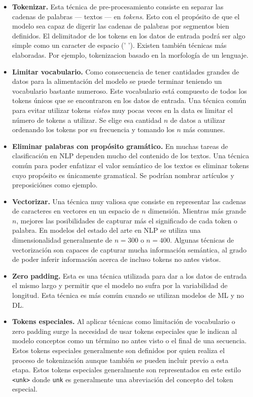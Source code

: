\begin{itemize}
\item \textbf{Tokenizar.} Esta técnica de pre-procesamiento consiste en separar las cadenas de palabras --- textos --- en \emph{tokens}. Esto con el propósito de que el modelo sea capaz de digerir las cadenas de palabras por segmentos bien definidos. El delimitador de los tokens en los datos de entrada podrá ser algo simple como un caracter de espacio (' '). Existen también técnicas más elaboradas. Por ejemplo, \gls{tokenizacion} basado en la morfología de un lenguaje.
\item \textbf{Limitar \gls{vocabulario}.} Como consecuencia de tener cantidades grandes de datos para la alimentación del modelo se puede terminar teniendo un vocabulario bastante numeroso. Este vocabulario está compuesto de todos los tokens únicos que se encontraron en los datos de entrada. Una técnica común para evitar utilizar tokens \emph{vistos} muy pocas veces en la data es limitar el número de tokens a utilizar. Se elige esa cantidad $n$ de datos a utilizar ordenando los tokens por su frecuencia y tomando los $n$ más comunes.
\item \textbf{Eliminar palabras con propósito gramático.} En muchas tareas de clasificación en NLP dependen mucho del contenido de los textos. Una técnica común para poder enfatizar el valor semántico de los textos es eliminar tokens cuyo propósito es únicamente gramatical. Se podrían nombrar artículos y preposiciónes como ejemplo.
\item \textbf{Vectorizar.} Una técnica muy valiosa que consiste en representar las cadenas de caracteres en vectores en un espacio de $n$ dimensión. Mientras más grande $n$, mejores las posibilidades de capturar más el significado de cada token o palabra. En modelos del estado del arte en NLP se utiliza una dimensionalidad generalmente de $n = 300$ o $n = 400$. Algunas técnicas de vectorización son capaces de capturar mucha información semántica, al grado de poder inferir información acerca de incluso tokens no antes vistos.
\item \textbf{Zero padding.} Esta es una técnica utilizada para dar a los datos de entrada el mismo largo y permitir que el modelo no sufra por la variabilidad de longitud. Esta técnica es más común cuando se utilizan modelos de ML y no DL.
\item \textbf{Tokens especiales.} Al aplicar técnicas como limitación de vocabulario o zero padding surge la necesidad de usar tokens especiales que le indican al modelo conceptos como un término no antes visto o el final de una secuencia. Estos tokens especiales generalmente son definidos por quien realiza el proceso de tokenización aunque también se pueden incluir previo a esta etapa. Estos tokens especiales generalmente son representados en este estilo \texttt{<unk>} donde \texttt{unk} es generalmente una abreviación del concepto del token especial. 
\end{itemize}

